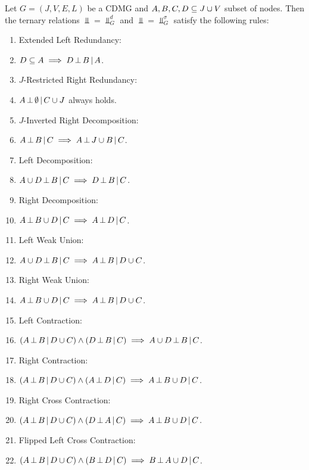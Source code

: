 \begin{DefThm}
    \label{d-sep-separoid-axioms}
    Let $G=(J,V,E,L)$ be a CDMG and $A,B,C,D \subseteq J \cup V$ subset of nodes.
Then the ternary relations $\Perp = \Perp_G^d$ and $\Perp = \Perp_G^\sigma$ satisfy the following rules:
\begin{enumerate}[label=\alph*)]
    \item Extended Left Redundancy: 
    \item[] $D \subseteq A \implies D \operatorname*{\perp}  B \operatorname*{|} A$.
    \item $J$-Restricted Right Redundancy: 
    \item[] $A \operatorname*{\perp}  \emptyset \operatorname*{|} C \cup J$ always holds.
    \item $J$-Inverted Right Decomposition: 
    \item[] $A \operatorname*{\perp}  B \operatorname*{|} C \implies A \operatorname*{\perp}  J \cup B \operatorname*{|} C$.
	\item Left Decomposition:  
	\item[]$A \cup D \operatorname*{\perp}  B \operatorname*{|} C \implies D \operatorname*{\perp}  B \operatorname*{|} C$.
  \item Right Decomposition:  	
    \item[] $A \operatorname*{\perp}  B \cup D\operatorname*{|} C \implies A \operatorname*{\perp}  D \operatorname*{|} C$.
    \item Left Weak Union:
    \item[] $A \cup D \operatorname*{\perp}  B  \operatorname*{|} C \implies A \operatorname*{\perp}  B \operatorname*{|} D \cup C$.
  \item Right Weak Union:\item[] $A \operatorname*{\perp}  B \cup D \operatorname*{|} C \implies A \operatorname*{\perp}  B \operatorname*{|} D \cup C$.
\item Left Contraction:\item[] 
 $ (A \operatorname*{\perp}  B \operatorname*{|} D \cup C) \land (D \operatorname*{\perp}  B \operatorname*{|} C) \implies A \cup D \operatorname*{\perp}  B \operatorname*{|} C$.
\item Right Contraction:
\item[] $ (A \operatorname*{\perp}  B \operatorname*{|} D \cup C) \land (A \operatorname*{\perp}  D \operatorname*{|} C)  \implies A \operatorname*{\perp}  B \cup D \operatorname*{|} C$.
\item Right Cross Contraction:
\item[] $ (A \operatorname*{\perp}  B \operatorname*{|} D \cup C) \land (D \operatorname*{\perp}  A \operatorname*{|} C) \implies A  \operatorname*{\perp}  B \cup D \operatorname*{|} C$.
\item Flipped Left Cross Contraction: 
\item[] $ (A \operatorname*{\perp}  B \operatorname*{|} D \cup C) \land (B \operatorname*{\perp}  D \operatorname*{|} C) \implies B \operatorname*{\perp}  A \cup D \operatorname*{|} C$.
\end{enumerate}

\end{DefThm}

